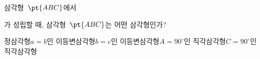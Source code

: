 삼각형~$\pt{ABC}$에서
\par\smallskip{}\par\smallskip\noindent
가 성립할 때, 삼각형~$\pt{ABC}$는 어떤 삼각형인가?
\begin{choicesii}{정삼각형}{$a=b$인 이등변삼각형}{$b=c$인 이등변삼각형}{$A=90^\circ$인 직각삼각형}{$C=90^\circ$인 직각삼각형}\end{choicesii}
